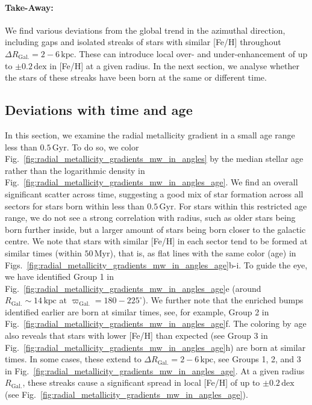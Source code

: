 \documentclass[twocolumn,apj,numberedappendix,appendixfloats,twocolappendix]{openjournal}
\newcommand{\nihaoAGEmax}{$0.5\,\mathrm{Gyr}$}
\begin{document}
\begin{CJK*}{UTF8}{gbsn}
\paragraph*{Take-Away:} We find various deviations from the global trend in the azimuthal direction, including gaps and isolated streaks of stars with similar [Fe/H] throughout $\Delta R_\mathrm{Gal.} = 2-6\,\mathrm{kpc}$. These can introduce local over- and under-enhancement of up to $\pm 0.2\,\mathrm{dex}$ in [Fe/H] at a given radius. In the next section, we analyse whether the stars of these streaks have been born at the same or different time.

\subsection{Deviations with time and age}
\label{sec:coherence_age_radial_metallicity_gradients}

In this section, we examine the radial metallicity gradient in a small age range less than \nihaoAGEmax. To do so, we color Fig.~\ref{fig:radial_metallicity_gradients_mw_in_angles} by the median stellar age rather than the logarithmic density in Fig.~\ref{fig:radial_metallicity_gradients_mw_in_angles_age}. We find an overall significant scatter across time, suggesting a good mix of star formation across all sectors for stars born within less than \nihaoAGEmax. For stars within this restricted age range, we do not see a strong correlation with radius, such as older stars being born further inside, but a larger amount of stars being born closer to the galactic centre. We note that stars with similar [Fe/H] in each sector tend to be formed at similar times (within $50\,\mathrm{Myr}$), that is, as flat lines with the same color (age) in Figs.~\ref{fig:radial_metallicity_gradients_mw_in_angles_age}b-i. To guide the eye, we have identified Group 1 in Fig.~\ref{fig:radial_metallicity_gradients_mw_in_angles_age}e (around $R_\mathrm{Gal.} \sim 14\,\mathrm{kpc}$ at $\varpi_\mathrm{Gal.} = 180-225^\circ$). We further note that the enriched bumps identified earlier are born at similar times, see, for example, Group 2 in Fig.~\ref{fig:radial_metallicity_gradients_mw_in_angles_age}f. The coloring by age also reveals that stars with lower [Fe/H] than expected (see Group 3 in Fig.~\ref{fig:radial_metallicity_gradients_mw_in_angles_age}h) are born at similar times. In some cases, these extend to $\Delta R_\mathrm{Gal.} = 2-6\,\mathrm{kpc}$, see Groups 1, 2, and 3 in Fig.~\ref{fig:radial_metallicity_gradients_mw_in_angles_age}. At a given radius $R_\mathrm{Gal.}$, these streaks cause a significant spread in local [Fe/H] of up to $\pm 0.2\,\mathrm{dex}$ (see Fig.~\ref{fig:radial_metallicity_gradients_mw_in_angles_age}).


\end{CJK*}
\end{document}
